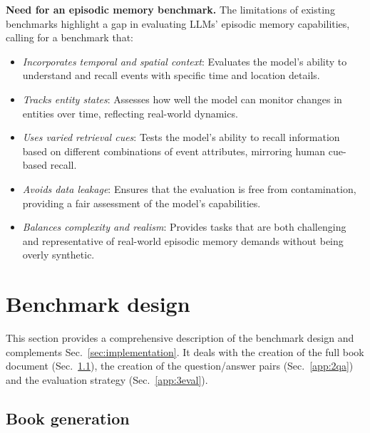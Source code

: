 \documentclass{article}
\begin{document}
\noindent \textbf{Need for an episodic memory benchmark.}
The limitations of existing benchmarks highlight a gap in evaluating LLMs' episodic memory capabilities, calling for a benchmark that:
\begin{itemize}
    \item \emph{Incorporates temporal and spatial context}: Evaluates the model's ability to understand and recall events with specific time and location details.
    \item \emph{Tracks entity states}: Assesses how well the model can monitor changes in entities over time, reflecting real-world dynamics.
    \item \emph{Uses varied retrieval cues}: Tests the model's ability to recall information based on different combinations of event attributes, mirroring human cue-based recall.
    \item \emph{Avoids data leakage}: Ensures that the evaluation is free from contamination, providing a fair assessment of the model's capabilities.
    \item \emph{Balances complexity and realism}: Provides tasks that are both challenging and representative of real-world episodic memory demands without being overly synthetic.
\end{itemize}





\section{Benchmark design}\label{app:benchmark_design}

This section provides a comprehensive description of the benchmark design and complements Sec.~\ref{sec:implementation}. It deals with the creation of the full book document (Sec.~\ref{app:1book}), the creation of the question/answer pairs (Sec.~\ref{app:2qa}) and the evaluation strategy (Sec.~\ref{app:3eval}).


\subsection{Book generation}\label{app:1book}

\end{document}
